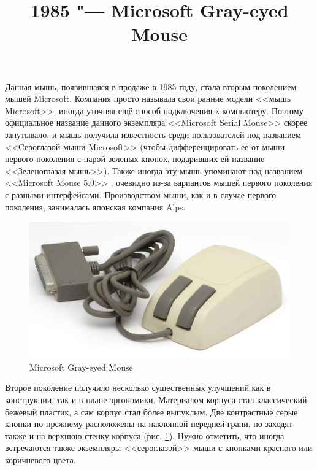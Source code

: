 \documentclass[11pt, a4paper]{article}
\begin{document}
\title{1985 "--- Microsoft Gray-eyed Mouse}
\date{}
\maketitle
{}

Данная мышь, появившаяся в продаже в 1985 году, стала вторым поколением мышей Microsoft. Компания просто называла свои ранние модели <<мышь Microsoft>>, иногда уточняя ещё способ подключения к компьютеру. Поэтому официальное название данного экземпляра <<Microsoft Serial Mouse>> скорее запутывало, и мышь получила известность среди пользователей под названием <<Cероглазой мыши Microsoft>> (чтобы дифференцировать ее от мыши первого поколения с парой зеленых кнопок, подаривших ей название <<Зеленоглазая мышь>>). Также иногда эту мышь упоминают под названием <<Microsoft Mouse 5.0>> \cite{mouses}, очевидно из-за вариантов мышей первого поколения с разными интерфейсами. Производством мыши, как и в случае первого поколения, занималась японская компания Alps.

\begin{figure}[h]
   \centering
    \includegraphics[scale=0.45]{1985_microsoft_gray_eyed_mouse/pic_30.jpg}
    \caption{Microsoft Gray-eyed Mouse}
    \label{fig:MicrosoftGrayEyedPic}
\end{figure}

Второе поколение получило несколько существенных улучшений как в конструкции, так и в плане эргономики. Материалом корпуса стал классический бежевый пластик, а сам корпус стал более выпуклым. Две контрастные серые кнопки по-прежнему расположены на наклонной передней грани, но заходят также и на верхнюю стенку корпуса (рис.  \ref{fig:MicrosoftGrayEyedPic}). Нужно отметить, что иногда встречаются также экземпляры <<сероглазой>> мыши с кнопками красного или коричневого цвета.
\end{document}
